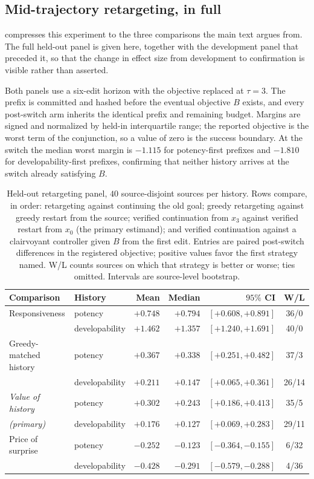 \subsection{Mid-trajectory retargeting, in full}
\label{app:ext-retarget}

 compresses this experiment to the three comparisons the main text argues from. The full held-out panel is given here, together with the development panel that preceded it, so that the change in effect size from development to confirmation is visible rather than asserted.

Both panels use a six-edit horizon with the objective replaced at $\tau=3$. The prefix is committed and hashed before the eventual objective $B$ exists, and every post-switch arm inherits the identical prefix and remaining budget. Margins are signed and normalized by held-in interquartile range; the reported objective is the worst term of the conjunction, so a value of zero is the success boundary. At the switch the median worst margin is $-1.115$ for potency-first prefixes and $-1.810$ for developability-first prefixes, confirming that neither history arrives at the switch already satisfying $B$.

\begin{table}[h]
\centering
{\small\setlength{\tabcolsep}{4pt}
\begin{tabular}{llrrrc}
\toprule
Comparison & History & Mean & Median & $95\%$ CI & W/L \\
\midrule
Responsiveness & potency & $+0.748$ & $+0.794$ & $[+0.608,+0.891]$ & 36/0 \\
 & developability & $+1.462$ & $+1.357$ & $[+1.240,+1.691]$ & 40/0 \\[2pt]
Greedy-matched history & potency & $+0.367$ & $+0.338$ & $[+0.251,+0.482]$ & 37/3 \\
 & developability & $+0.211$ & $+0.147$ & $[+0.065,+0.361]$ & 26/14 \\[2pt]
\emph{Value of history} & potency & $+0.302$ & $+0.243$ & $[+0.186,+0.413]$ & 35/5 \\
\emph{(primary)} & developability & $+0.176$ & $+0.127$ & $[+0.069,+0.283]$ & 29/11 \\[2pt]
Price of surprise & potency & $-0.252$ & $-0.123$ & $[-0.364,-0.155]$ & 6/32 \\
 & developability & $-0.428$ & $-0.291$ & $[-0.579,-0.288]$ & 4/36 \\
\bottomrule
\end{tabular}}
\caption{\small Held-out retargeting panel, $40$ source-disjoint sources per history. Rows compare, in order: retargeting against continuing the old goal; greedy retargeting against greedy restart from the source; verified continuation from $x_3$ against verified restart from $x_0$ (the primary estimand); and verified continuation against a clairvoyant controller given $B$ from the first edit. Entries are paired post-switch differences in the registered objective; positive values favor the first strategy named. W/L counts sources on which that strategy is better or worse; ties omitted. Intervals are source-level bootstrap.}
\label{tab:retarget-full}
\end{table}

